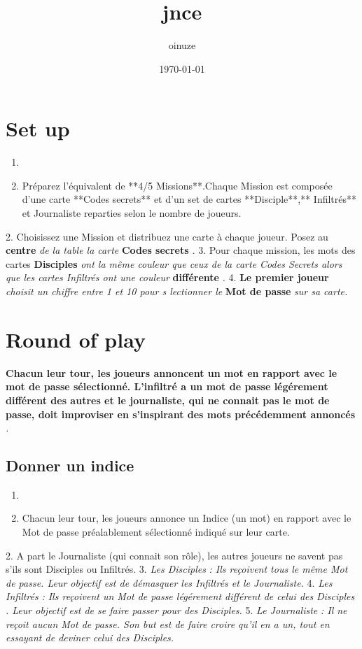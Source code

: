 \documentclass{article}%
\title{jnce}%
\author{oinuze}%
\date{\today}%
\begin{document}
%
\pagestyle{empty}%
\normalsize%
\maketitle%
\section{ Set up
}%
\label{sec:Setup}%
\begin{enumerate}%
\item%
%
\item%
 Préparez l'équivalent de **4/5 Missions**.Chaque Mission est composée d'une carte **Codes secrets** et d'un set de cartes **Disciple**,** Infiltrés** et Journaliste reparties selon le nombre de joueurs.
%
\end{enumerate}%
2. Choisissez une Mission et distribuez une carte à chaque joueur. Posez au %
\textbf{centre}%
\textit{ de la table la carte }%
\textbf{Codes secrets}%
\textit{.
}%
3. Pour chaque mission, les mots des cartes %
\textbf{Disciples}%
\textit{ ont la même couleur que ceux de la carte Codes Secrets alors que les cartes Infiltrés ont une couleur }%
\textbf{différente}%
\textit{.
}%
4. %
\textbf{Le premier joueur}%
\textit{ choisit un chiffre entre 1 et 10 pour s lectionner le }%
\textbf{Mot de passe}%
\textit{ sur sa carte.
}

%
\section{ Round of play
}%
\label{sec:Roundofplay}%
\textbf{Chacun leur tour, les joueurs annoncent un mot en rapport avec le mot de passe sélectionné. L'infiltré a un mot de passe légérement différent des autres et le journaliste, qui ne connait pas le mot de passe, doit improviser en s'inspirant des mots précédemment annoncés}%
\textit{.
}

%
\subsection{ Donner un indice
}%
\label{subsec:Donnerunindice}%
\begin{enumerate}%
\item%
%
\item%
 Chacun leur tour, les joueurs annonce un Indice (un mot) en rapport avec le Mot de passe préalablement sélectionné indiqué sur leur carte.
%
\end{enumerate}%
2. A part le Journaliste (qui connait son rôle), les autres joueurs ne savent pas s'ils sont Disciples ou Infiltrés.
%
3. %
\textit{Les Disciples}%
\textit{ : Ils reçoivent tous le même Mot de passe. Leur objectif est de démasquer les Infiltrés et le Journaliste.
}%
4. %
\textit{Les Infiltrés}%
\textit{ : Ils reçoivent un Mot de passe légérement différent de celui des }%
\textit{Disciples}%
\textit{. Leur objectif est de se faire passer pour des Disciples.
}%
5. %
\textit{Le Journaliste}%
\textit{ : Il ne reçoit aucun Mot de passe. Son but est de faire croire qu'il en a un, tout en essayant de deviner celui des Disciples.
}
\end{document}
